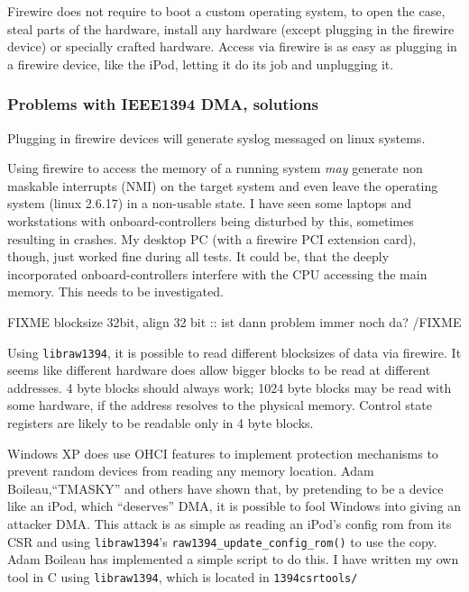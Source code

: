 Firewire does not require to boot a custom operating system, to open the case,
steal parts of the hardware, install any hardware (except plugging in the
firewire device) or specially crafted hardware.  Access via firewire is as easy
as plugging in a firewire device, like the iPod, letting it do its job and
unplugging it.




\subsubsection{Problems with IEEE1394 DMA, solutions}

Plugging in firewire devices will generate syslog messaged on linux systems.

Using firewire to access the memory of a running system \emph{may} generate non
maskable interrupts (NMI) on the target system and even leave the operating
system (linux 2.6.17) in a non-usable state. I have seen some laptops and
workstations with onboard-controllers being disturbed by this, sometimes
resulting in crashes. My desktop PC (with a firewire PCI extension card),
though, just worked fine during all tests. It could be, that the deeply
incorporated onboard-controllers interfere with the CPU accessing the main
memory. This needs to be investigated.

FIXME blocksize 32bit, align 32 bit :: ist dann problem immer noch da? /FIXME

Using \texttt{libraw1394}, it is possible to read different blocksizes of data
via firewire.  It seems like different hardware does allow bigger blocks to be
read at different addresses. 4 byte blocks should always work; 1024 byte blocks
may be read with some hardware, if the address resolves to the physical memory.
Control state registers are likely to be readable only in 4 byte blocks.

\label{windows-dma} Windows XP does use OHCI features to implement protection
mechanisms to prevent random devices from reading any memory location.  Adam
Boileau,``TMASKY'' and others have shown \cite{rux2k6firewire:2006} that, by
pretending to be a device like an iPod, which ``deserves'' DMA, it is possible
to fool Windows into giving an attacker DMA.  This attack is as simple as
reading an iPod's config rom from its CSR and using \texttt{libraw1394}'s
\texttt{raw1394\_update\_config\_rom()} to use the copy.  Adam Boileau has
implemented a simple script to do this. I have written my own tool in C using
\texttt{libraw1394}, which is located in \texttt{1394csrtools/}



